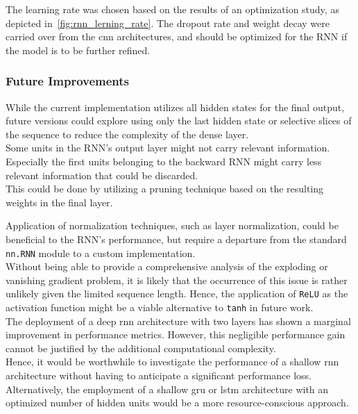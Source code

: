 The learning rate was chosen based on the results of an optimization study, as depicted in~\autoref{fig:rnn_lerning_rate}.
The dropout rate and weight decay were carried over from the \gls{cnn} architectures, and should be optimized for the RNN if
the model is to be further refined.\\

\subsubsection{Future Improvements}
\label{subsub:future_improvements_rnn}

While the current implementation utilizes all hidden states for the
final output, future versions could explore using only the last hidden state or selective slices of the sequence to
reduce the complexity of the dense layer.\\
Some units in the RNN's output layer might not carry relevant information. Especially the first units belonging to the
backward RNN might carry less relevant information that could be discarded.\\
This could be done by utilizing a pruning technique based on the resulting weights in the final layer.

Application of normalization techniques, such as layer normalization, could be beneficial to the RNN's performance, but
require a departure from the standard \texttt{nn.RNN} module to a custom implementation.\\

Without being able to provide a comprehensive analysis of the exploding or vanishing gradient problem, it is likely that
the occurrence of this issue is rather unlikely given the limited sequence length. Hence, the application of \texttt{ReLU}
as the activation function might be a viable alternative to \texttt{tanh} in future work.\\

The deployment of a deep \gls{rnn} architecture with two layers has shown a marginal improvement in performance metrics.
However, this negligible performance gain cannot be justified by the additional computational complexity.\\
Hence, it would be worthwhile to investigate the performance of a shallow \gls{rnn} architecture without having to anticipate
a significant performance loss.\\
Alternatively, the employment of a shallow \gls{gru} or \gls{lstm} architecture with an optimized number of hidden
units would be a more resource-conscious approach.\\